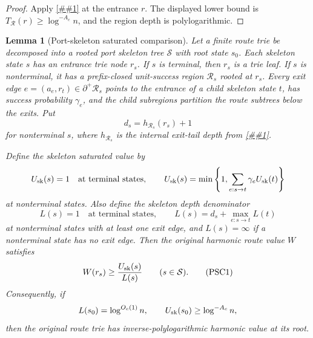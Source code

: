 \documentclass[10pt]{article}
\newcommand{\cref}[1]{\ref{##1}}
\newtheorem{lemma}[theorem]{Lemma}
\theoremstyle{definition}
\begin{document}
\begin{proof}
   Apply \cref{lem:ported-unit-region-contraction} at the entrance \(r\).  The
   displayed lower bound is \(T_{\mathcal R}(r)\ge\log^{-A_c}n\), and the
   region depth is polylogarithmic.
\end{proof}

\begin{lemma}[Port-skeleton saturated comparison]
   \label{lem:port-skeleton-saturated-comparison}
   Let a finite route trie be decomposed into a rooted port skeleton tree
   \(\mathcal S\) with root state \(s_0\).  Each skeleton state \(s\) has an
   entrance trie node
   \(r_s\).  If \(s\) is terminal, then \(r_s\) is a trie leaf.  If \(s\) is
   nonterminal, it has a prefix-closed unit-success region
   \(\mathcal R_s\) rooted at \(r_s\).  Every exit edge
   \(e=(a_e,r_t)\in\partial^+\mathcal R_s\) points to the entrance of a child
   skeleton state \(t\), has success probability \(\gamma_e\), and the child
   subregions partition the route subtrees below the exits.  Put
   \[
      d_s=h_{\mathcal R_s}(r_s)+1
   \]
   for nonterminal \(s\), where \(h_{\mathcal R_s}\) is the internal
   exit-tail depth from \cref{lem:ported-unit-region-contraction}.

   Define the skeleton saturated value by
   \[
      U_{\rm sk}(s)=1
      \quad\text{at terminal states},
      \qquad
      U_{\rm sk}(s)=
      \min\left\{1,\sum_{e:s\to t}\gamma_eU_{\rm sk}(t)\right\}
   \]
   at nonterminal states.  Also define the skeleton depth denominator
   \[
      L(s)=1
      \quad\text{at terminal states},
      \qquad
      L(s)=d_s+\max_{e:s\to t}L(t)
   \]
   at nonterminal states with at least one exit edge, and \(L(s)=\infty\) if a
   nonterminal state has no exit edge.  Then the original harmonic route
   value \(W\) satisfies
   \[
      W(r_s)\ge\frac{U_{\rm sk}(s)}{L(s)}
      \qquad(s\in\mathcal S).
      \tag{PSC1}
   \]
   Consequently, if
   \[
      L(s_0)=\log^{O_c(1)}n,
      \qquad
      U_{\rm sk}(s_0)\ge\log^{-A_c}n,
   \]
   then the original route trie has inverse-polylogarithmic harmonic value at
   its root.
\end{lemma}
\end{document}
